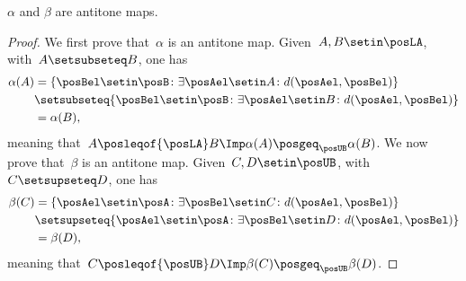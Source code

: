 \begin{lemma}
    \label{lem:alfabetaantitone}
    $\alpha$ and $\beta$ are antitone maps.
\end{lemma}
\begin{proof}
    We first prove that~$\alpha$ is an antitone map.
    Given~$A,B\setin \posLA$, with~$A\setsubseteq B$, one has
    \begin{equation}
        \begin{aligned}
            \alpha(A) & =\{ \posBel\setin \posB \colon \exists \posAel\setin A\colon d(\posAel,\posBel)\} \\
                      & \setsubseteq \{\posBel\setin \posB \colon \exists \posAel\setin B\colon d(\posAel,\posBel)\} \\
                      & =\alpha(B),
        \end{aligned}
    \end{equation}
    meaning that~$A\posleqof{\posLA} B\Imp \alpha(A) \posgeq_{\posUB} \alpha(B)$.
    We now prove that~$\beta$ is an antitone map.
    Given~$C,D\setin \posUB$, with~$C\setsupseteq D$, one has
    \begin{equation}
        \begin{aligned}
            \beta(C) & =\{\posAel\setin \posA\colon \exists \posBel\setin C\colon d(\posAel,\posBel)\} \\
                     & \setsupseteq \{\posAel\setin \posA\colon \exists \posBel\setin D \colon d(\posAel,\posBel)\} \\
                     & =\beta(D),
        \end{aligned}
    \end{equation}
    meaning that~$C\posleqof{\posUB} D \Imp \beta(C)\posgeq_{\posUB} \beta(D)$.
\end{proof}

